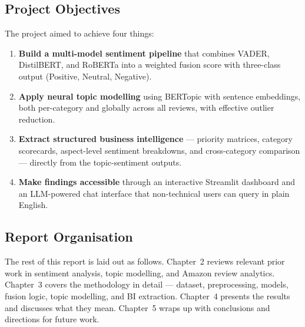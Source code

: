 \subsection{Project Objectives}
\begin{justify}
The project aimed to achieve four things:

\begin{enumerate}
    \item \textbf{Build a multi-model sentiment pipeline} that combines VADER, DistilBERT, and RoBERTa into a weighted fusion score with three-class output (Positive, Neutral, Negative).

    \item \textbf{Apply neural topic modelling} using BERTopic with sentence embeddings, both per-category and globally across all reviews, with effective outlier reduction.

    \item \textbf{Extract structured business intelligence} — priority matrices, category scorecards, aspect-level sentiment breakdowns, and cross-category comparison — directly from the topic-sentiment outputs.

    \item \textbf{Make findings accessible} through an interactive Streamlit dashboard and an LLM-powered chat interface that non-technical users can query in plain English.
\end{enumerate}
\end{justify}

\subsection{Report Organisation}
\begin{justify}
The rest of this report is laid out as follows. Chapter~2 reviews relevant prior work in sentiment analysis, topic modelling, and Amazon review analytics. Chapter~3 covers the methodology in detail — dataset, preprocessing, models, fusion logic, topic modelling, and BI extraction. Chapter~4 presents the results and discusses what they mean. Chapter~5 wraps up with conclusions and directions for future work.
\end{justify}
